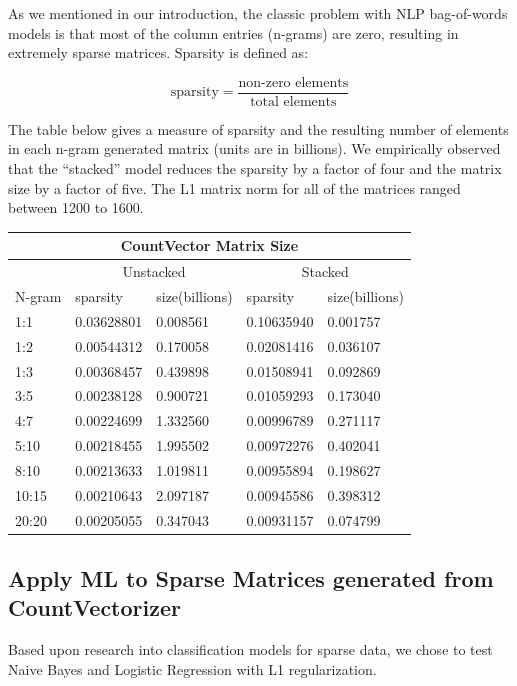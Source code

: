 \documentclass[11pt]{article}
\newcommand{\vertSpace}[1]{\vspace{3mm}}
\begin{document}
{As we mentioned in our introduction, the classic problem with NLP bag-of-words models is that most of the column entries (n-grams) are zero, resulting in extremely sparse matrices.  
Sparsity is defined as:

$$\mbox{sparsity} = \frac{\mbox{non-zero elements}}{\mbox{total elements}}$$

The table below gives a measure of sparsity  and the resulting number of elements in each n-gram generated matrix (units are in billions).  We empirically observed that the ``stacked'' model reduces the sparsity by a factor of four and the matrix size by a factor of five. The L1 matrix norm for all of the matrices ranged between 1200 to 1600.\\

\noindent 
\begin{center}
\begin{tabular}{ |p{2cm}||p{2cm}|p{2cm}|p{2cm}|p{2cm}|  }
 \hline
 \multicolumn{5}{|c|}{CountVector Matrix Size} \\
 \hline
 \multicolumn{1}{|c|}{} &
 \multicolumn{2}{|c|}{Unstacked} &
 \multicolumn{2}{|c|}{Stacked}\\
 \hline
 N-gram & sparsity & size(billions) & sparsity & size(billions)\\
 \hline
       1:1& 0.03628801& 0.008561&  0.10635940&   0.001757 \\
       1:2& 0.00544312& 0.170058&  0.02081416&    0.036107\\
       1:3& 0.00368457& 0.439898&  0.01508941&     0.092869\\
       3:5& 0.00238128& 0.900721&  0.01059293&     0.173040\\
       4:7& 0.00224699& 1.332560&  0.00996789&     0.271117\\
      5:10& 0.00218455& 1.995502&  0.00972276&     0.402041\\
      8:10& 0.00213633& 1.019811&  0.00955894&     0.198627\\
     10:15& 0.00210643& 2.097187&  0.00945586&     0.398312\\
     20:20& 0.00205055& 0.347043&  0.00931157&     0.074799\\
 \hline
\end{tabular}
\end{center}




\subsection{Apply ML to Sparse Matrices generated from CountVectorizer}
\noindent
Based upon research into classification models for sparse data, we chose to test Naive Bayes and Logistic Regression with L1 regularization.  \vertSpace

}
\end{document}
